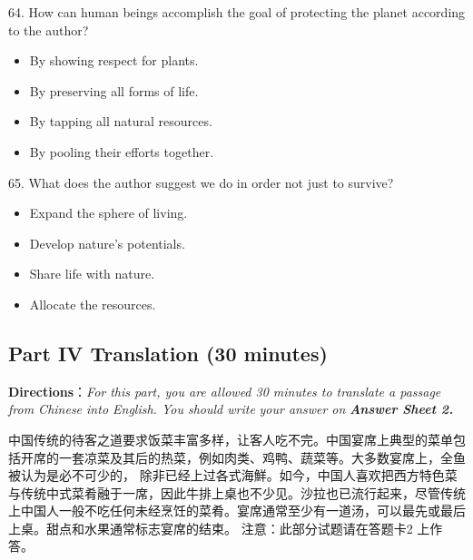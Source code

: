 \documentclass[UTF8,11pt]{ctexart}
\begin{document}
64. How can human beings accomplish the goal of protecting the planet according to the author?


\begin{itemize}[leftmargin=2em,itemsep=.2em,topsep=.4em]\item[A.] By showing respect for plants.
\item[B.] By preserving all forms of life.
\item[C.] By tapping all natural resources.
\item[D.] By pooling their efforts together.
\end{itemize}

65. What does the author suggest we do in order not just to survive?


\begin{itemize}[leftmargin=2em,itemsep=.2em,topsep=.4em]\item[A.] Expand the sphere of living.
\item[B.] Develop nature’s potentials.
\item[C.] Share life with nature.
\item[D.] Allocate the resources.
\end{itemize}

\subsection*{\textbf{Part} IV \textbf{Translation} \textbf{(30 minutes)}}


\textbf{Directions}：\textit{For this part, you are allowed 30 minutes to translate a passage from Chinese into English. You should write} \textit{your answer on}\textbf{\textit{ Answer Sheet 2.}}


中国传统的待客之道要求饭菜丰富多样，让客人吃不完。中国宴席上典型的菜单包括开席的一套凉菜及其后的热菜，例如肉类、鸡鸭、蔬菜等。大多数宴席上，全鱼被认为是必不可少的， 除非已经上过各式海鮮。如今，中国人喜欢把西方特色菜与传统中式菜肴融于一席，因此牛排上桌也不少见。沙拉也已流行起来，尽管传统上中国人一般不吃任何未经烹饪的菜肴。宴席通常至少有一道汤，可以最先或最后上桌。甜点和水果通常标志宴席的结束。 注意：此部分试题请在答题卡2 上作答。
\end{document}
